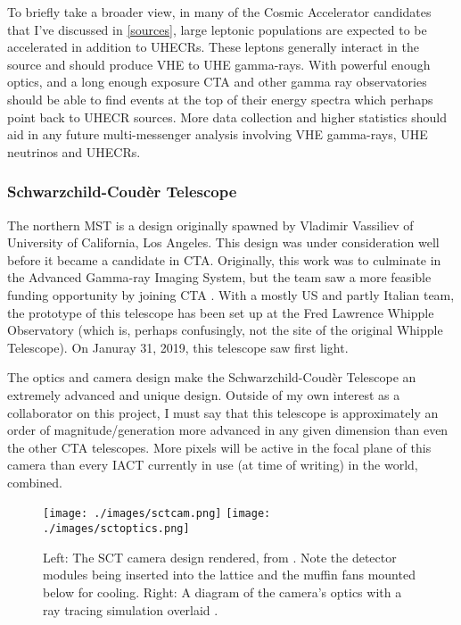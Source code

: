 To briefly take a broader view, in many of the Cosmic Accelerator candidates that I've discussed in \autoref{sources}, large leptonic populations are expected to be accelerated in addition to UHECRs. These leptons generally interact in the source and should produce VHE to UHE gamma-rays. With powerful enough optics, and a long enough exposure CTA and other gamma ray observatories should be able to find events at the top of their energy spectra which perhaps point back to UHECR sources. More data collection and higher statistics should aid in any future multi-messenger analysis involving VHE gamma-rays, UHE neutrinos and UHECRs. 

\subsubsection{Schwarzchild-Coud\`{e}r Telescope}
The northern MST is a design originally spawned by Vladimir Vassiliev of University of California, Los Angeles. This design was under consideration well before it became a candidate in CTA. Originally, this work was to culminate in the Advanced Gamma-ray Imaging System, but the team saw a more feasible funding opportunity by joining CTA \cite{agis}. With a mostly US and partly Italian team, the prototype of this telescope has been set up at the Fred Lawrence Whipple Observatory (which is, perhaps confusingly, not the site of the original Whipple Telescope). On Januray 31, 2019, this telescope saw first light. 

The optics and camera design make the Schwarzchild-Coud\`{e}r Telescope an extremely advanced and unique design. Outside of my own interest as a collaborator on this project, I must say that this telescope is approximately an order of magnitude/generation more advanced in any given dimension than even the other CTA telescopes. More pixels will be active in the focal plane of this camera than every IACT currently in use (at time of writing) in the world, combined.

\begin{figure}[h!]
\begin{center}
\label{sctdiag}
\texttt{[image: ./images/sctcam.png]}
\texttt{[image: ./images/sctoptics.png]}
\caption[SCT Camera and Optics]{Left: The SCT camera design rendered, from \textcite{vladscope}. Note the detector modules being inserted into the lattice and the muffin fans mounted below for cooling. Right: A diagram of the camera's optics with a ray tracing simulation overlaid \cite{psctoptics}.}

\end{center}
\end{figure}

